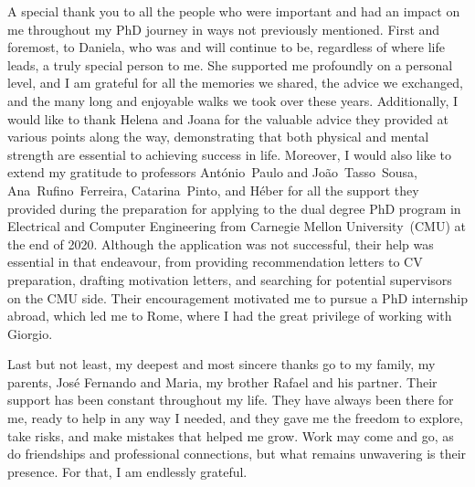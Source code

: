 A special thank you to all the people who were important and had an impact on me
throughout my PhD journey in ways not previously mentioned. First and foremost,
to Daniela, who was and will continue to be, regardless of where life leads,
a truly special person to me. She supported me profoundly on a personal level,
and I am grateful for all the memories we shared, the advice we exchanged,
and the many long and enjoyable walks we took over these years.
Additionally, I would like to thank Helena and Joana for the valuable advice
they provided at various points along the way, demonstrating that both
physical and mental strength are essential to achieving success in life.
Moreover, I would also like to extend my gratitude to professors António~Paulo
and João~Tasso~Sousa, Ana~Rufino~Ferreira, Catarina~Pinto, and Héber for all the
support they provided during the preparation for applying to the dual degree PhD
program in Electrical and Computer Engineering from
Carnegie Mellon University~(CMU) at the end of 2020.
Although the application was not successful, their help was essential in that
endeavour, from providing recommendation letters to CV preparation,
drafting motivation letters, and searching for potential supervisors
on the CMU side. Their encouragement motivated me to pursue a PhD internship
abroad, which led me to Rome, where I had the great privilege of
working with Giorgio.

Last but not least, my deepest and most sincere thanks go to my family, my
parents, José Fernando and Maria, my brother Rafael and his partner.
Their support has been constant throughout my life. They have always been there
for me, ready to help in any way I needed, and they gave me the freedom to
explore, take risks, and make mistakes that helped me grow.
Work may come and go, as do friendships and professional connections, but
what remains unwavering is their presence. For that, I am endlessly grateful.

\vspace{10mm}

\cleardoublepage
